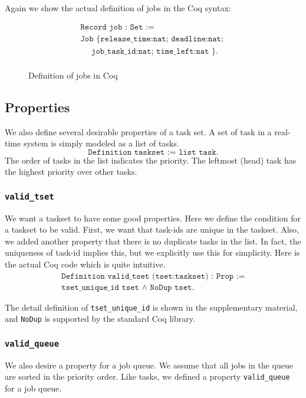\documentclass[nocopyrightspace]{sigplanconf}
\begin{document}
Again we show the actual definition of jobs in the Coq syntax:

\begin{figure}[H]
  \[
  \begin{array}{l}
    \texttt{Record job : Set :=} \\
    \texttt{Job \{ release\_time:nat; deadline:nat; } \\
    \texttt{{~~~~}job\_task\_id:nat; time\_left:nat \}. }\\
  \end{array}
  \]
  \caption{ Definition of jobs in Coq }\label{fig:job}

\end{figure}

\subsection{Properties}

We also define several desirable properties of a task set. A set of task in a real-time system is simply modeled as a list of tasks.
\[ \texttt{Definition taskset := list task.} \]
The order of tasks in the list indicates the priority. The leftmost (head) task has the highest priority over other tasks.

\subsubsection{\texttt{valid\_tset}}
We want a taskset to have some good properties. Here we define the condition for a taskset to be valid. First, we want that task-ids are unique in the taskset. Also, we added another property that there is no duplicate tasks in the list. In fact, the uniqueness of task-id implies this, but we explicitly use this for simplicity. Here is the actual Coq code which is quite intuitive.
\[
\begin{array}{l}
  \texttt{Definition valid\_tset (tset:taskset) : Prop :=} \\
  \texttt{tset\_unique\_id tset $\wedge$ NoDup tset.}
\end{array}
\]

The detail definition of \texttt{tset\_unique\_id} is shown in the supplementary material, and \texttt{NoDup} is supported by the standard Coq library.

\subsubsection{\texttt{valid\_queue}}
We also desire a property for a job queue. We assume that all jobs in the queue are sorted in the priority order. Like tasks, we defined a property \texttt{valid\_queue} for a job queue.
\end{document}

